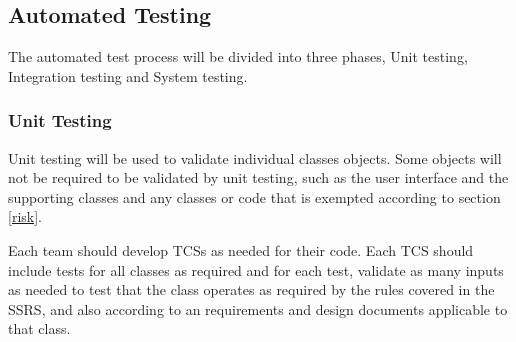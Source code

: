 \documentclass[report]{article}
\begin{document}
\subsection{Automated Testing}
The automated test process will be divided into three phases, Unit testing, Integration testing and System testing.

\subsubsection{Unit Testing}
Unit testing will be used to validate individual classes objects. Some objects will not be required to be validated by unit testing, such as the user interface and the supporting classes and any classes or code that is exempted according to section \ref{risk}.

Each team should develop TCSs as needed for their code. Each TCS should include tests for all classes as required and for each test, validate as many inputs as needed to test that the class operates as required by the rules covered in the SSRS, and also according to an requirements and design documents applicable to that class.
\end{document}

